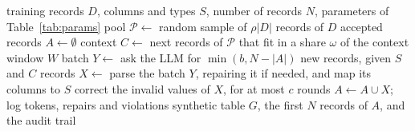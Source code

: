\documentclass[conference]{IEEEtran}
\providecommand{\DIFaddend}{} %
\DeclareRobustCommand{\DIFaddend}{\DIFOaddend \let\includegraphics\DIFOincludegraphics} %
\begin{document}
\begin{algorithm}[t]
\small
\begin{algorithmic}[1]
\Require training records $D$, columns and types $S$, number of records $N$, parameters of Table~\ref{tab:params}
\State pool $\mathcal{P}\gets$ random sample of $\rho|D|$ records of $D$
\State accepted records $A\gets\emptyset$ 
\Repeat
  \State context $C\gets$ next records of $\mathcal{P}$ that fit in a share $\omega$ of the context window $W$ 
  \State batch $Y\gets$ ask the LLM for $\min(b,N-|A|)$ new records, given $S$ and $C$ 
  \State records $X\gets$ parse the batch $Y$, repairing it if needed, and map its columns to $S$ 
  \State correct the invalid values of $X$, for at most $c$ rounds 
  \State $A\gets A\cup X$; log tokens, repairs and violations 
\State \Return synthetic table $G$, the first $N$ records of $A$, and the audit trail
\end{algorithmic}
\end{algorithm}
\DIFaddend 
\end{document}
